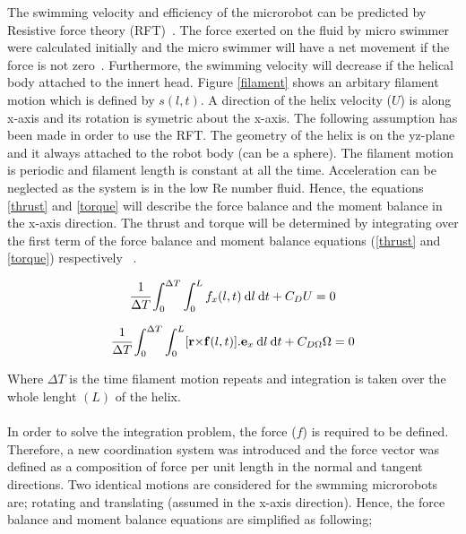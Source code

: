 \documentclass[12pt,a4paper,titlepage]{report}
\begin{document}
The swimming velocity and efficiency of the microrobot can be predicted by Resistive force theory (RFT)~\citep{purcell1997efficiency}. 
The force exerted on the fluid by micro swimmer were calculated initially and the micro swimmer will have a net 
movement if the force is not zero~\citep{Doe:2013:Online}. Furthermore, the swimming velocity will decrease if the helical
body attached to the innert head. Figure \ref{filament} shows an arbitary filament motion which is defined by $s(l,t)$. 
A direction of the helix velocity ($U$) is along x-axis and its rotation is symetric about the x-axis. 
The following assumption has been made in order to use the RFT. The geometry
of the helix is on the yz-plane and it always attached to the robot body (can be a sphere). The 
filament motion is periodic and filament length is constant at all the time. Acceleration can be neglected as the
system is in the low Re number fluid. Hence, the equations \ref{thrust} and \ref{torque} will describe the force balance and 
the moment balance in the x-axis direction. The thrust and torque will be determined by integrating over the 
first term of the force balance and moment balance equations (\ref{thrust} and \ref{torque}) 
 respectively ~\citep{edd2003biomimetic}.



\begin{equation}
  \cfrac {1} {\Delta T} \int_0^{\Delta T} \int_0^L  f_x(l,t)\: \mathrm{d}l \:\mathrm{d}t + C_DU  = 0
\label{thrust}
\end{equation}

\begin{equation}
  \cfrac {1} {\Delta T}  \int_0^{\Delta T} \int_0^L [\bold r \bold \times \bold f(l,t)] . \bold e_x \: \mathrm{d}l \:\mathrm{d}t + C_{D\Omega}\Omega= 0
\label{torque}
\end{equation}

Where $\Delta T$ is the time filament motion repeats and integration is taken over the whole lenght $(L)$ of the
helix. 

\paragraph{}
In order to solve the integration problem, the force ($f$) is required to be defined. Therefore, a new
coordination system was introduced and the force vector was defined as a composition of force per unit length
in the normal and tangent directions. Two identical motions are considered for the swmming microrobots
are; rotating and translating (assumed in the x-axis direction). Hence, the force balance and moment balance 
equations are simplified as following; 
\end{document}
